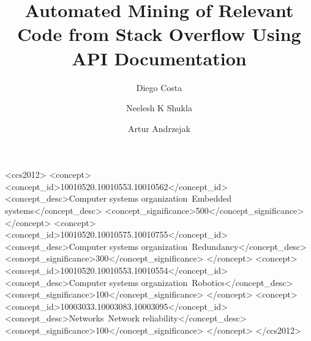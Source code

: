 \documentclass[sigconf, review]{acmart}
\begin{document}
	
	
	\title{Automated Mining of Relevant Code from Stack Overflow Using API Documentation}
	


\author{Diego Costa}	
	
	\author{Neelesh K Shukla}
	
	\author{Artur Andrzejak}
	
	
	
	\begin{abstract}
		
	\end{abstract}
	
	\begin{CCSXML}
		<ccs2012>
		<concept>
		<concept_id>10010520.10010553.10010562</concept_id>
		<concept_desc>Computer systems organization~Embedded systems</concept_desc>
		<concept_significance>500</concept_significance>
		</concept>
		<concept>
		<concept_id>10010520.10010575.10010755</concept_id>
		<concept_desc>Computer systems organization~Redundancy</concept_desc>
		<concept_significance>300</concept_significance>
		</concept>
		<concept>
		<concept_id>10010520.10010553.10010554</concept_id>
		<concept_desc>Computer systems organization~Robotics</concept_desc>
		<concept_significance>100</concept_significance>
		</concept>
		<concept>
		<concept_id>10003033.10003083.10003095</concept_id>
		<concept_desc>Networks~Network reliability</concept_desc>
		<concept_significance>100</concept_significance>
		</concept>
		</ccs2012>
	\end{CCSXML}
	
\end{document}

